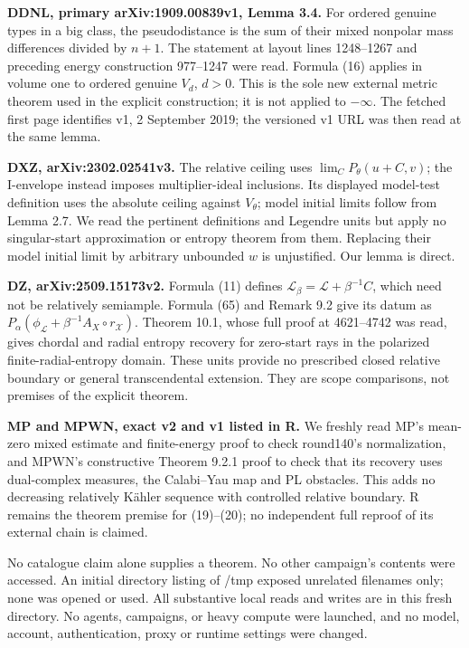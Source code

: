 \documentclass[
  11pt,
]{article}
\begin{document}
\textbf{DDNL, primary arXiv:1909.00839v1, Lemma 3.4.} For ordered
genuine types in a big class, the pseudodistance is the sum of their
mixed nonpolar mass differences divided by \(n+1\). The statement at
layout lines 1248--1267 and preceding energy construction 977--1247 were
read. Formula (16) applies in volume one to ordered genuine \(V_d\),
\(d>0\). This is the sole new external metric theorem used in the
explicit construction; it is not applied to \(-\infty\). The fetched
first page identifies v1, 2 September 2019; the versioned v1 URL was
then read at the same lemma.

\textbf{DXZ, arXiv:2302.02541v3.} The relative ceiling uses
\(\lim_C P_\theta(u+C,v)\); the I-envelope instead imposes
multiplier-ideal inclusions. Its displayed model-test definition uses
the absolute ceiling against \(V_\theta\); model initial limits follow
from Lemma 2.7. We read the pertinent definitions and Legendre units but
apply no singular-start approximation or entropy theorem from them.
Replacing their model initial limit by arbitrary unbounded \(w\) is
unjustified. Our lemma is direct.

\textbf{DZ, arXiv:2509.15173v2.} Formula (11) defines
\(\mathcal L_\beta=\mathcal L+\beta^{-1}C\), which need not be
relatively semiample. Formula (65) and Remark 9.2 give its datum as
\(P_\alpha(\phi_\mathcal L+\beta^{-1}A_X\circ r_\mathcal X)\). Theorem
10.1, whose full proof at 4621--4742 was read, gives chordal and radial
entropy recovery for zero-start rays in the polarized
finite-radial-entropy domain. These
units provide no prescribed closed relative boundary or general
transcendental extension. They are scope comparisons, not premises of
the explicit theorem.

\textbf{MP and MPWN, exact v2 and v1 listed in R.} We freshly read MP's
mean-zero mixed estimate and finite-energy proof to check round140's
normalization, and MPWN's constructive Theorem 9.2.1 proof to check that
its recovery uses dual-complex measures, the Calabi--Yau map and PL
obstacles. This adds no decreasing relatively Kähler sequence with
controlled relative boundary. R remains the theorem premise for
(19)--(20); no independent full reproof of its external chain is
claimed.

No catalogue claim alone supplies a theorem. No other campaign's
contents were accessed. An initial directory listing of /tmp exposed
unrelated filenames only; none was opened or used. All substantive local
reads and writes are in this fresh directory. No agents, campaigns, or
heavy compute were launched, and no model, account, authentication,
proxy or runtime settings were changed.
\end{document}
